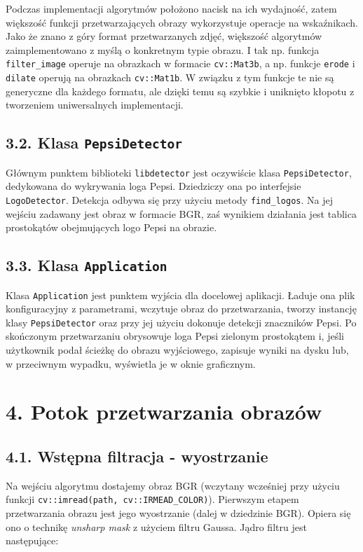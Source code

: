 \documentclass[11pt,a4paper,twoside]{report}
\begin{document}
		Podczas implementacji algorytmów położono nacisk na ich wydajność, zatem większość funkcji przetwarzających obrazy wykorzystuje operacje na wskaźnikach. Jako że znano z góry format przetwarzanych zdjęć, większość algorytmów zaimplementowano z myślą o konkretnym typie obrazu. I tak np. funkcja \texttt{filter\_image} operuje na obrazkach w formacie \texttt{cv::Mat3b}, a np. funkcje \texttt{erode} i \texttt{dilate} operują na obrazkach \texttt{cv::Mat1b}. W związku z tym funkcje te nie są generyczne dla każdego formatu, ale dzięki temu są szybkie i uniknięto kłopotu z tworzeniem uniwersalnych implementacji.

	\subsection*{3.2. Klasa \texttt{PepsiDetector}}

		Głównym punktem biblioteki \texttt{libdetector} jest oczywiście klasa \texttt{PepsiDetector}, dedykowana do wykrywania loga Pepsi. Dziedziczy ona po interfejsie \texttt{LogoDetector}. Detekcja odbywa się przy użyciu metody \texttt{find\_logos}. Na jej wejściu zadawany jest obraz w formacie BGR, zaś wynikiem działania jest tablica prostokątów obejmujących logo Pepsi na obrazie.

	\subsection*{3.3. Klasa \texttt{Application}}

		Klasa \texttt{Application} jest punktem wyjścia dla docelowej aplikacji. Ładuje ona plik konfiguracyjny z parametrami, wczytuje obraz do przetwarzania, tworzy instancję klasy \texttt{PepsiDetector} oraz przy jej użyciu dokonuje detekcji znaczników Pepsi. Po skończonym przetwarzaniu obrysowuje loga Pepsi zielonym prostokątem i, jeśli użytkownik podał ścieżkę do obrazu wyjściowego, zapisuje wyniki na dysku lub, w przeciwnym wypadku, wyświetla je w oknie graficznym.

\section*{4. Potok przetwarzania obrazów}

	\subsection*{4.1. Wstępna filtracja - wyostrzanie}

			Na wejściu algorytmu dostajemy obraz BGR (wczytany wcześniej przy użyciu funkcji \texttt{cv::imread(path, cv::IRMEAD\_COLOR)}). Pierwszym etapem przetwarzania obrazu jest jego wyostrzanie (dalej w dziedzinie BGR). Opiera się ono o technikę \emph{unsharp mask} z użyciem filtru Gaussa. Jądro filtru jest następujące:
\end{document}
